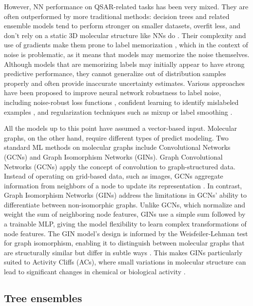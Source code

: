 However, NN performance on QSAR-related tasks has been very mixed. They are often outperformed by more traditional methods: decision trees and related ensemble models tend to perform stronger on smaller datasets, overfit less, and don't rely on a static 3D molecular structure like NNs do \citep{Baskin2008, Koutsoukas2017}. Their complexity and use of gradients make them prone to label memorization \citep{Zhang2017}, which in the context of noise is problematic, as it means that models may memorize the noise themselves. Although models that are memorizing labels may initially appear to have strong predictive performance, they cannot generalize out of distribution samples properly and often provide inaccurate uncertainty estimates. Various approaches have been proposed to improve neural network robustness to label noise, including noise-robust loss functions \citep{Zhang2017}, confident learning to identify mislabeled examples \citep{Northcutt2021}, and regularization techniques such as mixup or label smoothing \citep{Zhang2017}. 

All the models up to this point have assumed a vector-based input. Molecular graphs, on the other hand, require different types of predict modeling. Two standard ML methods on molecular graphs include Convolutional Networks (GCNs) and Graph Isomorphism Networks (GINs). Graph Convolutional Networks (GCNs) apply the concept of convolution to graph-structured data. Instead of operating on grid-based data, such as images, GCNs aggregate information from neighbors of a node to update its representation \citep{TeachOpenCADD2023, Xu2019}. In contrast, Graph Isomorphism Networks (GINs) address the limitations in GCNs’ ability to differentiate between non-isomorphic graphs. Unlike GCNs, which normalize and weight the sum of neighboring node features, GINs use a simple sum followed by a trainable MLP, giving the model flexibility to learn complex transformations of node features. The GIN model’s design is informed by the Weisfeiler-Lehman test for graph isomorphism, enabling it to distinguish between molecular graphs that are structurally similar but differ in subtle ways \citep{TeachOpenCADD2023, Xu2019}. This makes GINs particularly suited to Activity Cliffs (ACs), where small variations in molecular structure can lead to significant changes in chemical or biological activity \citep{TeachOpenCADD2023}. 


\subsection{Tree ensembles}


